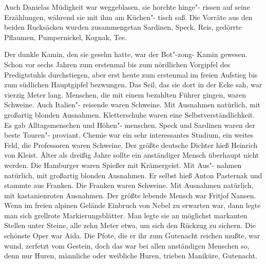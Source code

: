 Auch Danielas Müdigkeit war weggeblasen, sie horchte hinge"-%
rissen auf seine Erzählungen, während sie mit ihm am Küchen"-%
tisch saß. Die Vorräte aus den beiden Rucksäcken wurden
zusammengetan\dopp{} Sardinen, Speck, Reis, gedörrte Pflaumen,
Pumpernickel, Kognak, Tee.

Der dunkle Kamin, den sie gesehn hatte, war der Bot"-zong-%
Kamin gewesen. Schon vor sechs Jahren zum erstenmal bis
zum nördlichen Vorgipfel des Predigtstuhls durchstiegen,
aber erst heute zum erstenmal im freien Aufstieg bis zum
südlichen Hauptgipfel bezwungen. Das Seil, das sie dort in
der Ecke sah, war vierzig Meter lang. Menschen, die mit einem
bezahlten Führer gingen, waren Schweine. Auch Italien"-%
reisende waren Schweine. Mit Ausnahmen natürlich, mit
großartig blonden Ausnahmen. Kletterschuhe waren eine
Selbstverständlichkeit. Es gab Alltagsmenschen und Höhen"-%
menschen. Speck und Sardinen waren der beste Touren"-%
proviant. Chemie war ein sehr interessantes Studium, ein
weites Feld, die Professoren waren Schweine. Der größte
deutsche Dichter hieß Heinrich von Kleist. Älter als dreißig
Jahre sollte ein anständiger Mensch überhaupt nicht werden.
Die Hamburger waren Spießer mit Krämergeist. Mit Aus"-%
nahmen natürlich, mit großartig blonden Ausnahmen. Er
selbst hieß Anton Pasternak und stammte aus Franken. Die
Franken waren Schweine. Mit Ausnahmen natürlich, mit
kastanienroten Ausnahmen. Der größte lebende Mensch war
Fritjof Nansen. Wenn im freien alpinen Gelände Einbruch
von Nebel zu erwarten war, dann legte man sich grellrote
Markierungsblätter. Man legte sie an möglichst markanten
Stellen unter Steine, alle zehn Meter etwa, um sich den
Rückzug zu sichern. Die schönste Oper war Aida. Die Pfote,
die er ihr zum Gutenacht reichen mußte, war wund, zerfetzt
vom Gestein, doch das war bei allen anständigen Menschen
so, denn nur Huren, männliche oder weibliche Huren, trieben
Maniküre, Gutenacht.

